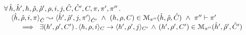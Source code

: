 \begin{lemma}\label{lemma:soundness:single:step}
$$
\begin{array}{l}
\forall \, \sheap, \sheap', \heap, \sstore, \sstore', \store, i, j, \sctx, \sctx', \ctx, \pc, \pc', \pc'' \, . \,  \\ 
\quad \symbtrans{\sheap, \sstore, i, \pc}{\sheap', \sstore', j, \pc'}[\sctx][\sctx'] 
   \ \wedge \ 
      (\heap, \store, \ctx) \in \smodels{\sheap, \sstore, \sctx}{\pc''} 
            \ \wedge \ \pc'' \vdash \pc' \\ \quad \quad 
      	 \ \implies \ \exists (\heap', \store', \ctx') \, . \, 
	 	 \semtrans{\heap, \store, i}{\heap', \store', j}[\ctx][\ctx']
		\, \wedge \, 
		(\heap', \store', \ctx') \in \smodels{\sheap', \sstore', \sctx'}{\pc''}  
\end{array}
$$
\end{lemma}
%
